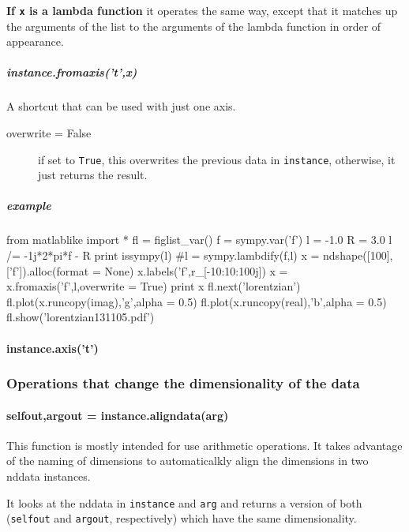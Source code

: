 \textbf{If \texttt{x} is a lambda function} it operates the same way, except that it matches up the arguments of the list to the arguments of the lambda function in order of appearance.

\subparagraph{instance.fromaxis('t',x)}
A shortcut that can be used with just one axis.

\begin{mykwargs}
    \begin{description}
        \item[overwrite = False] 
            if set to \texttt{True}, this overwrites the previous data in \texttt{instance}, otherwise, it just returns the result.
    \end{description}
\end{mykwargs}

\subparagraph{example}

\begin{python}
from matlablike import *
fl = figlist_var()
f = sympy.var('f')
l = -1.0
R = 3.0
l /= -1j*2*pi*f - R
print issympy(l)
#l = sympy.lambdify(f,l)
x = ndshape([100],['f']).alloc(format = None)
x.labels('f',r_[-10:10:100j])
x = x.fromaxis('f',l,overwrite = True)
print x
fl.next('lorentzian')
fl.plot(x.runcopy(imag),'g',alpha = 0.5)
fl.plot(x.runcopy(real),'b',alpha = 0.5)
fl.show('lorentzian131105.pdf')
\end{python}

\paragraph{instance.axis('t')}
\subsubsection{Operations that change the dimensionality of the data}
\paragraph{selfout,argout = instance.aligndata(arg)}\label{codelabel:aligndata}
This function is mostly intended for use arithmetic operations.
It takes advantage of the naming of dimensions to automaticalkly
    align the dimensions in two nddata instances.

It looks at the nddata in \texttt{instance} and \texttt{arg} and
    returns a version of both
    (\texttt{selfout} and \texttt{argout}, respectively)
    which have the same dimensionality.

